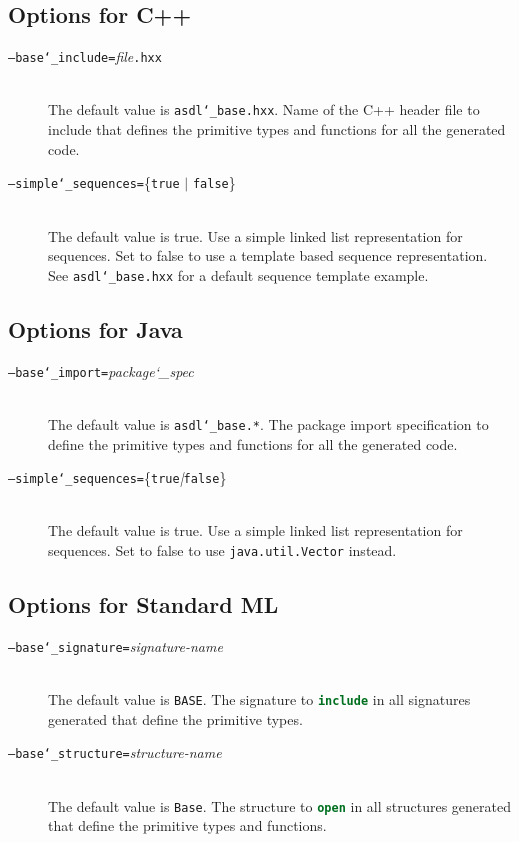 \subsection{Options for C++}

\begin{description}
  \item[\normalfont\texttt{--base\char`\_include=}\textit{file}\texttt{.hxx}] \mbox{}\\
    The default value is \texttt{asdl\char`\_base.hxx}. Name of the C++ header file to
    include that defines the primitive types and functions for all the generated
    code.
  \item[\normalfont\texttt{--simple\char`\_sequences=}\{\texttt{true} $|$ \texttt{false}\}] \mbox{}\\
    The default value is true. Use a simple linked list representation
    for sequences. Set to false to use a template based sequence
    representation. See \texttt{asdl\char`\_base.hxx} for a default sequence template
    example.
\end{description}%

\subsection{Options for Java}
\begin{description}
  \item[\normalfont\texttt{--base\char`\_import=}\textit{package\char`\_spec}] \mbox{}\\
    The default value is \texttt{asdl\char`\_base.*}. The package import specification
    to define the primitive types and functions for all the generated
    code.
  \item[\normalfont\texttt{--simple\char`\_sequences=}\{\texttt{true}\textit{|}\texttt{false}\}] \mbox{}\\
    The default value is true. Use a simple linked list representation
    for sequences. Set to false to use  \texttt{java.util.Vector} instead.
\end{description}%

\subsection{Options for Standard ML}
\begin{description}
  \item[\normalfont\texttt{--base\char`\_signature=}\textit{signature-name}] \mbox{}\\
    The default value is \texttt{BASE}. The signature to \lstinline[language=SML]!include! in
    all signatures generated that define the primitive types.
  \item[\normalfont\texttt{--base\char`\_structure=}\textit{structure-name}] \mbox{}\\
    The default value is \texttt{Base}. The structure to \lstinline[language=SML]!open! in
    all structures generated that define the primitive types and functions.
\end{description}%

